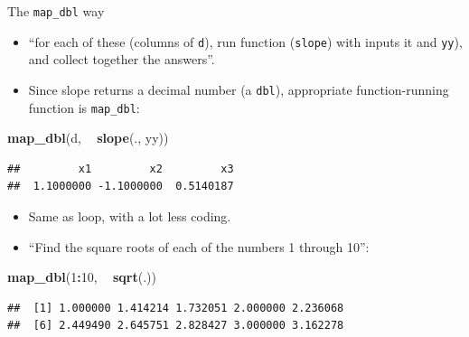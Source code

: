 \documentclass[ignorenonframetext,]{beamer}
\newenvironment{Shaded}{\begin{snugshade}}{\end{snugshade}}
\newcommand{\DecValTok}[1]{\textcolor[rgb]{0.00,0.00,0.81}{#1}}
\newcommand{\KeywordTok}[1]{\textcolor[rgb]{0.13,0.29,0.53}{\textbf{#1}}}
\newcommand{\NormalTok}[1]{#1}
\newcommand{\OperatorTok}[1]{\textcolor[rgb]{0.81,0.36,0.00}{\textbf{#1}}}
\newcommand{\StringTok}[1]{\textcolor[rgb]{0.31,0.60,0.02}{#1}}
\providecommand{\tightlist}{%
  \setlength{\itemsep}{0pt}\setlength{\parskip}{0pt}}
\begin{document}
\begin{frame}[fragile]{The \texttt{map\_dbl} way}
\protect\hypertarget{the-map_dbl-way}{}

\begin{itemize}
\tightlist
\item
  ``for each of these (columns of \texttt{d}), run function
  (\texttt{slope}) with inputs it and \texttt{yy}), and collect together
  the answers''.
\item
  Since slope returns a decimal number (a \texttt{dbl}), appropriate
  function-running function is \texttt{map\_dbl}:
\end{itemize}

\begin{Shaded}
\begin{Highlighting}[]
\KeywordTok{map_dbl}\NormalTok{(d, }\OperatorTok{~}\StringTok{ }\KeywordTok{slope}\NormalTok{(., yy))}
\end{Highlighting}
\end{Shaded}

\begin{verbatim}
##         x1         x2         x3 
##  1.1000000 -1.1000000  0.5140187
\end{verbatim}

\begin{itemize}
\tightlist
\item
  Same as loop, with a lot less coding.
\item
  ``Find the square roots of each of the numbers 1 through 10'':
\end{itemize}

\begin{Shaded}
\begin{Highlighting}[]
\KeywordTok{map_dbl}\NormalTok{(}\DecValTok{1}\OperatorTok{:}\DecValTok{10}\NormalTok{, }\OperatorTok{~}\StringTok{ }\KeywordTok{sqrt}\NormalTok{(.))}
\end{Highlighting}
\end{Shaded}

\begin{verbatim}
##  [1] 1.000000 1.414214 1.732051 2.000000 2.236068
##  [6] 2.449490 2.645751 2.828427 3.000000 3.162278
\end{verbatim}

\end{frame}
\end{document}
